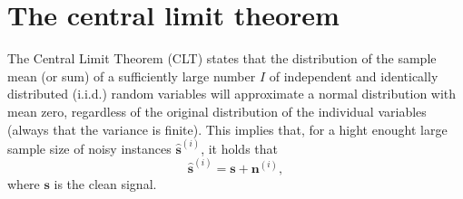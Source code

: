 \documentclass{article}
\begin{document}






\section{The central limit theorem}
\label{sec:CLT}

The Central Limit Theorem (CLT) states that the distribution of the
sample mean (or sum) of a sufficiently large number $I$ of independent
and identically distributed (i.i.d.) random variables will approximate
a normal distribution with mean zero, regardless of the original
distribution of the individual variables \cite{kendall1968advanced}
(always that the variance is finite). This implies that, for a hight
enought large sample size of noisy instances $\hat{\mathbf{s}}^{(i)}$,
it holds that
\begin{equation}
  \hat{\mathbf{s}}^{(i)} = \mathbf{s} + \mathbf{n}^{(i)},
\end{equation}
where $\mathbf{s}$ is the clean signal.
\end{document}
